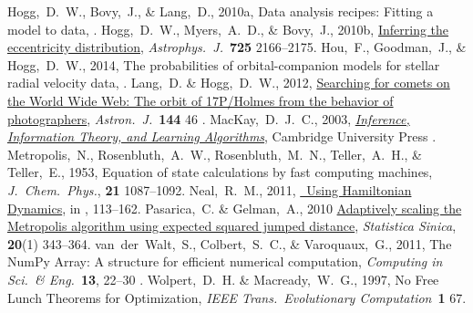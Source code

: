 \documentclass[12pt,twoside,pdftex]{article}
\newcommand{\MCMC}{\acronym{MCMC}}
\begin{document}
\begin{thebibliography}{}
  Hogg,~D.~W., Bovy,~J., \& Lang,~D., 2010a,
  Data analysis recipes: Fitting a model to data,
  .
  Hogg,~D.~W., Myers,~A.~D., \& Bovy,~J., 2010b,
  \href{http://adsabs.harvard.edu/abs/2010ApJ...725.2166H}{Inferring the eccentricity distribution},
  \textit{Astrophys.\ J.}\ \textbf{725} 2166--2175.
  Hou,~F., Goodman,~J., \& Hogg,~D.~W., 2014,
  The probabilities of orbital-companion models for stellar radial velocity data,
  .
  Lang,~D. \& Hogg,~D.~W., 2012,
  \href{http://adsabs.harvard.edu/abs/2012AJ....144...46L}{Searching for comets on the World Wide Web:
    The orbit of 17P/Holmes from the behavior of photographers},
  \textit{Astron.\ J.}\ \textbf{144} 46
  .
  MacKay,~D.~J.~C., 2003,
  \href{http://www.inference.phy.cam.ac.uk/mackay/itila/book.html}{\textit{Inference, Information Theory, and Learning Algorithms}},
  Cambridge University Press
  .
  Metropolis,~N., Rosenbluth,~A.~W., Rosenbluth,~M.~N., Teller,~A.~H., \& Teller,~E., 1953,
  Equation of state calculations by fast computing machines,
  \textit{J.\ Chem.\ Phys.}, \textbf{21} 1087--1092.
  Neal,~R.~M., 2011,
  \href{http://www.mcmchandbook.net/HandbookChapter5.pdf}{\MCMC\ Using Hamiltonian Dynamics},
  in \citet{mcmchandbook}, 113--162.
  Pasarica,~C. \& Gelman,~A., 2010
  \href{http://www.jstor.org/stable/24308995}{Adaptively scaling the Metropolis algorithm using expected squared jumped distance},
  \textit{Statistica Sinica}, \textbf{20}(1) 343--364.
  van~der~Walt,~S., Colbert,~S.~C., \& Varoquaux,~G., 2011,
  The NumPy Array: A structure for efficient numerical computation,
  \textit{Computing in Sci.\ \& Eng.}\ \textbf{13}, 22--30
  .
  Wolpert,~D.~H. \& Macready,~W.~G., 1997,
  No Free Lunch Theorems for Optimization,
  \textit{IEEE Trans.\ Evolutionary Computation}\ \textbf{1} 67.
\end{thebibliography}
\end{document}
